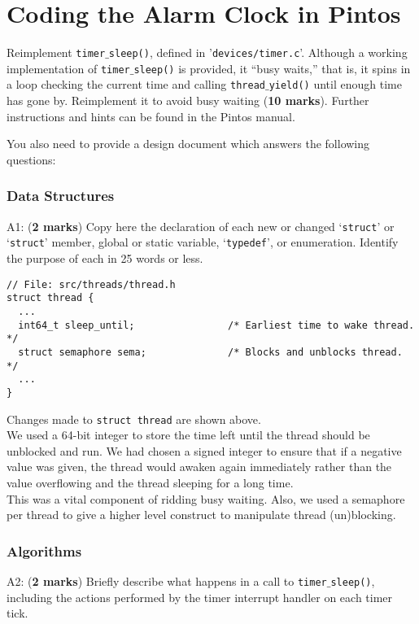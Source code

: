 \documentclass[a4paper,12pt]{article}
\begin{document}
\section*{Coding the Alarm Clock in Pintos}
Reimplement \texttt{timer$\_$sleep()}, defined in '\texttt{devices/timer.c}’.
Although a working implementation of \texttt{timer$\_$sleep()} is provided, it “busy waits,” that is, it spins in a loop checking the current time and calling \texttt{thread$\_$yield()} until enough time has gone by.
Reimplement it to avoid busy waiting ({\bf 10 marks}).
Further instructions and hints can be found in the Pintos manual.

You also need to provide a design document which answers the following questions:

\subsubsection*{Data Structures}
A1: ({\bf 2 marks}) Copy here the declaration of each new or changed `\texttt{struct}' or `\texttt{struct}' member, global or static variable, `\texttt{typedef}', or enumeration. Identify the purpose of each in 25 words or less.

\begin{verbatim}
// File: src/threads/thread.h
struct thread {
  ...
  int64_t sleep_until;                /* Earliest time to wake thread. */
  struct semaphore sema;              /* Blocks and unblocks thread. */
  ...
}
\end{verbatim}

Changes made to \texttt{struct thread} are shown above. \\

We used a 64-bit integer to store the time left until the thread should be unblocked and run. We had chosen a signed integer to ensure that if a negative value was given, the thread would awaken again immediately rather than the value overflowing and the thread sleeping for a long time. \\

This was a vital component of ridding busy waiting. Also, we used a semaphore per thread to give a higher level construct to manipulate thread (un)blocking.

\subsubsection*{Algorithms}
A2: ({\bf 2 marks}) Briefly describe what happens in a call to \texttt{timer$\_$sleep()}, including the actions performed by the timer interrupt handler on each timer tick. \\
\end{document}

